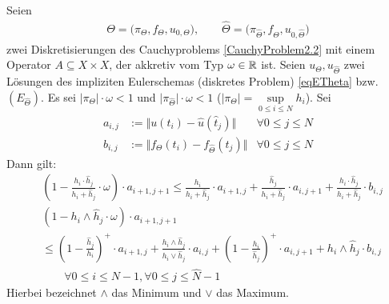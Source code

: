 \begin{lemma}
	Seien 
	\begin{align*}
		\Theta=\big(\pi_\Theta,f_\Theta,u_{0,\Theta}\big),\qquad
		\hat{\Theta}=\big(\pi_{\hat{\Theta}},f_{\hat{\Theta}},u_{0,\hat{\Theta}}\big)
	\end{align*}
	zwei Diskretisierungen des Cauchyproblems \eqref{CauchyProblem2.2} mit einem Operator $A\subseteq X\times X$, der akkretiv vom Typ $\omega\in\mathbb{R}$ ist. 
	Seien $u_\Theta,u_{\hat{\Theta}}$ zwei Lösungen des impliziten Eulerschemas (diskretes Problem) \eqref{eqETheta} bzw. $(E_{\hat{\Theta}})$.
	Es sei $\big|\pi_\Theta\big|\cdot\omega<1$ und $\big|\pi_{\hat{\Theta}}\big|\cdot\omega<1$ ($\big|\pi_\Theta\big|=\sup\limits_{0\leq i\leq N} h_i$). 
	Sei
	\begin{align*}
		a_{i,j}&:=\Big\Vert u(t_i)-\hat{u}(\hat{t}_j)\Big\Vert &\forall 0\leq j\leq N\\
		b_{i,j}&:=\Big\Vert f_\Theta(t_i)-f_{\hat{\Theta}}(t_j)\Big\Vert &\forall 0\leq j\leq N
	\end{align*}
	Dann gilt:
	\begin{align*}
		&\left(1-\frac{h_i\cdot\hat{h}_j}{h_i+\hat{h}_j}\cdot\omega\right)\cdot a_{i+1,j+1}
		\leq\frac{h_i}{h_i+\hat{h}_j}\cdot a_{i+1,j}+\frac{\hat{h}_j}{h_i+\hat{h}_j}\cdot a_{i,j+1}+\frac{h_i\cdot\hat{h}_j}{h_i+\hat{h}_j}\cdot b_{i,j}\\
		&\left(1-h_i\wedge\hat{h}_j\cdot\omega\right)\cdot a_{i+1,j+1}\\
		&\leq\left(1-\frac{\hat{h}_j}{h_i}\right)^+\cdot a_{i+1,j}+\frac{h_i\wedge\hat{h}_j}{h_i\vee\hat{h}_j}\cdot a_{i,j}+\left(1-\frac{h_i}{\hat{h}_j}\right)^+\cdot a_{i,j+1}+h_i\wedge\hat{h}_j\cdot b_{i,j}\\
		&\qquad\forall 0\leq i\leq N-1,\forall 0\leq j\leq\hat{N}-1
	\end{align*}
	Hierbei bezeichnet $\wedge$ das Minimum und $\vee$ das Maximum.
\end{lemma}

